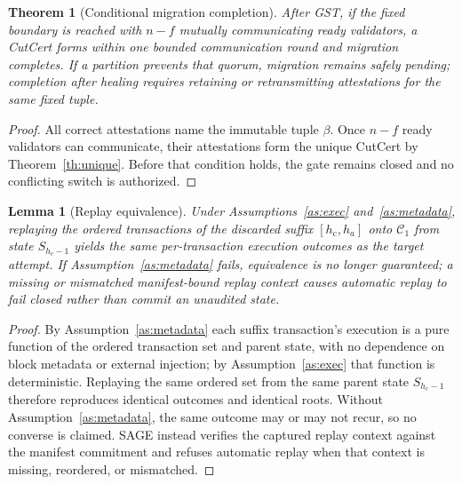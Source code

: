 \documentclass[journal]{IEEEtran}
\newtheorem{theorem}{Theorem}
\newtheorem{lemma}{Lemma}
\theoremstyle{definition}
\theoremstyle{remark}
\begin{document}
\begin{theorem}[Conditional migration completion]
\label{th:termination}
After GST, if the fixed boundary is reached with $n-f$ mutually communicating ready validators, a
CutCert forms within one bounded communication round and migration completes. If a partition
prevents that quorum, migration remains safely pending; completion after healing requires retaining
or retransmitting attestations for the same fixed tuple.
\end{theorem}
\begin{proof}
All correct attestations name the immutable tuple $\beta$. Once $n-f$ ready validators can
communicate, their attestations form the unique CutCert by Theorem~\ref{th:unique}. Before that
condition holds, the gate remains closed and no conflicting switch is authorized.
\end{proof}

\begin{lemma}[Replay equivalence]
\label{lem:replay}
Under Assumptions~\ref{as:exec} and~\ref{as:metadata}, replaying the ordered transactions of the
discarded suffix $[h_{\mathrm{c}}, h_a]$ onto $\mathcal{C}_1$ from state $S_{h_{\mathrm{c}}-1}$
yields the same per-transaction execution outcomes as the target attempt. If Assumption~\ref{as:metadata} fails, equivalence is no longer guaranteed; a missing or
mismatched manifest-bound replay context causes automatic replay to fail closed rather than commit
an unaudited state.
\end{lemma}
\begin{proof}
By Assumption~\ref{as:metadata} each suffix transaction's execution is a pure function of the
ordered transaction set and parent state, with no dependence on block metadata or external
injection; by Assumption~\ref{as:exec} that function is deterministic. Replaying the same ordered
set from the same parent state $S_{h_{\mathrm{c}}-1}$ therefore reproduces identical outcomes and
identical roots. Without Assumption~\ref{as:metadata}, the same outcome may or may not recur, so no converse is
claimed. SAGE instead verifies the captured replay context against the manifest commitment and
refuses automatic replay when that context is missing, reordered, or mismatched.
\end{proof}
\end{document}
